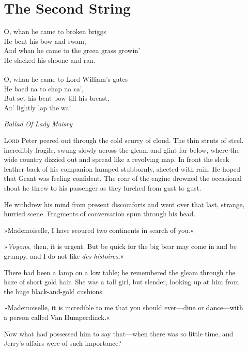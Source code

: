 
\chapter{The Second String}

\epigraph{
O, whan he came to broken briggs\\
He bent his bow and swam,\\
And whan he came to the green grass growin'\\
He slacked his shoone and ran.\\
~\\
O, whan he came to Lord William's gates\\
He baed na to chap na ca',\\
But set his bent bow till his breast,\\
An' lightly lap the wa'.}{\textit{Ballad Of Lady Maisry}}



\lettrine[lines=4]{L}{ord} Peter peered out through the cold scurry of cloud. The thin
struts of steel, incredibly fragile, swung slowly across the gleam
and glint far below, where the wide country dizzied out and spread
like a revolving map. In front the sleek leather back of his companion
humped stubbornly, sheeted with rain. He hoped that Grant was feeling
confident. The roar of the engine drowned the occasional shout he threw
to his passenger as they lurched from gust to gust.

He withdrew his mind from present discomforts and went over that last,
strange, hurried scene. Fragments of conversation spun through his head.

»Mademoiselle, I have scoured two continents in search of you.«

»\textit{Voyons}, then, it is urgent. But be quick for the big bear may come
in and be grumpy, and I do not like \textit{des histoires}.«

There had been a lamp on a low table; he remembered the gleam through
the haze of short gold hair. She was a tall girl, but slender, looking
up at him from the huge black-and-gold cushions.

»Mademoiselle, it is incredible to me that you should ever\allowbreak---\allowbreak dine or
dance\allowbreak---\allowbreak with a person called Van Humperdinck.«

Now what had possessed him to say that\allowbreak---\allowbreak when there was so little time,
and Jerry's affairs were of such importance?

